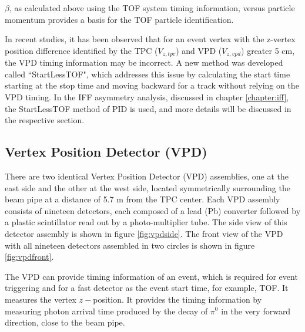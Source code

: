 $\beta$, as calculated above using the TOF system timing information, versus particle momentum provides a basis for the TOF particle identification. 

In recent studies, it has been observed that for an event vertex with the z-vertex position difference identified by the TPC  ($V_{z,tpc}$) and VPD ($V_{z,vpd}$) greater 5 cm, the VPD timing information may be incorrect. 
A new method was developed called ``StartLessTOF", which addresses this issue by calculating the start time starting at the stop time and moving backward for a track without relying on the VPD timing. In the IFF asymmetry analysis, discussed in chapter \ref{chapter:iff}, the StartLessTOF method of PID is used, and more details will be discussed in the respective section.  


\subsection{Vertex Position Detector (VPD)}
\label{subsec:vpd}
There are two identical Vertex Position Detector (VPD) \cite{Llope:2014nva} assemblies, one at the east side and the other at the west side, located symmetrically surrounding the beam pipe at a distance of 5.7 m from the TPC center. Each VPD assembly consists of nineteen detectors, each composed of a lead (Pb) converter followed by a plastic scintillator read out by a photo-multiplier tube. The side view of this detector assembly is shown in figure \ref{fig:vpdside}. The front view of the VPD with all nineteen detectors assembled in two circles is shown in figure \ref{fig:vpdfront}.  



The VPD can provide timing information of an event, which is required for event triggering and for a fast detector as the event start time, for example, TOF. It measures the vertex $z-$position. It provides the timing information by measuring photon arrival time produced by the decay of $\pi^0$ in the very forward direction, close to the beam pipe.   

